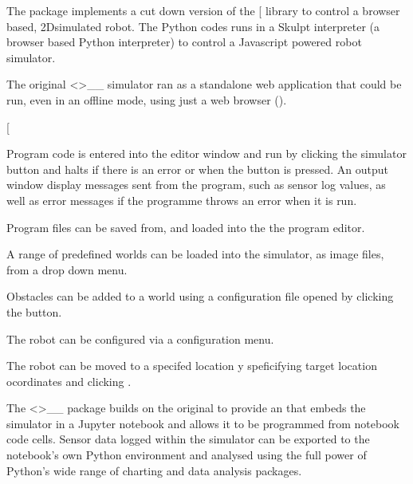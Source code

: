 \documentclass[letterpaper,10pt,english]{sphinxmanual}
\let\sphinxpxdimen\pdfpxdimen\else\newdimen\sphinxpxdimen
\begin{document}
The  package implements a cut down version of the {[}\sphinxcode{\sphinxupquote{ev3dev\sphinxhyphen{}lang\sphinxhyphen{}python}}{]} library to control a browser based, 2D\sphinxhyphen{}simulated robot. The  Python codes runs in a Skulpt interpreter (a browser based Python interpreter) to control a Javascript powered robot simulator.

The original  \textless{}\textgreater{}\textasciigrave{}\_\_ simulator ran as a standalone web application that could be run, even in an offline mode, using just a web browser ().

{[}\sphinxincludegraphics[width=1618\sphinxpxdimen,height=1470\sphinxpxdimen]{{EV3DEV_Python_Simulator}.png}

Program code is entered into the editor window and run by clicking the simulator  button and halts if there is an error or when the  button is pressed. An output window display messages sent from the program, such as sensor log values, as well as error messages if the programme throws an error when it is run.

Program files can be saved from, and loaded into the the program editor.

A range of predefined worlds can be loaded into the simulator, as image files, from a drop down menu.

Obstacles can be added to a world using a configuration file opened by clicking the  button.

The robot can be configured via a configuration menu.

The robot can be moved to a specifed location y speficifying target location oc\sphinxhyphen{}ordinates and clicking .

The  \textless{}\textgreater{}\textasciigrave{}\_\_ package builds on the original  to provide an  that embeds the simulator in a Jupyter notebook and allows it to be programmed from notebook code cells. Sensor data logged within the simulator can be exported to the notebook’s own Python environment and analysed using the full power of Python’s wide range of charting and data analysis packages.
\end{document}
